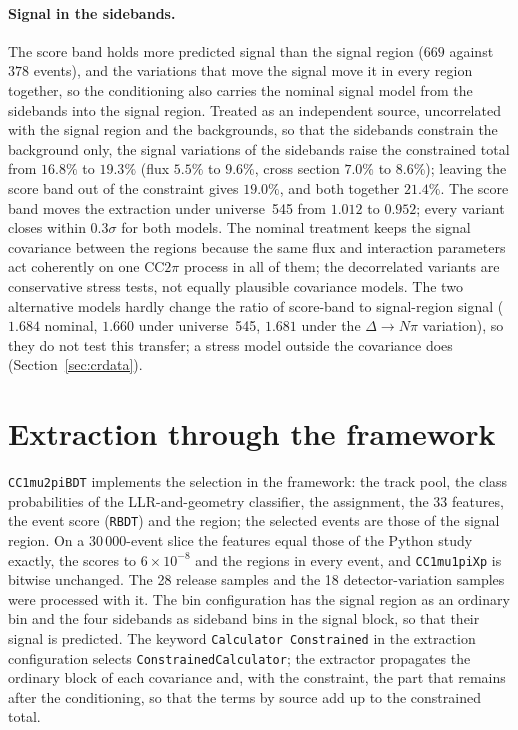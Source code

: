 \documentclass[11pt,a4paper]{article}
\begin{document}
\paragraph{Signal in the sidebands.} The score band holds more predicted signal than the signal region
($669$ against $378$ events), and the variations that move the signal move it in every region together, so
the conditioning also carries the nominal signal model from the sidebands into the signal region. Treated
as an independent source, uncorrelated with the signal region and the backgrounds, so that the sidebands
constrain the background only, the signal variations of the sidebands raise the constrained total from
$16.8\%$ to $19.3\%$ (flux $5.5\%$ to $9.6\%$, cross section $7.0\%$ to $8.6\%$); leaving the score band out
of the constraint gives $19.0\%$, and both together $21.4\%$. The score band moves the extraction under
universe~545 from $1.012$ to $0.952$; every variant closes within $0.3\sigma$ for both models. The nominal
treatment keeps the signal covariance between the regions because the same flux and interaction parameters act
coherently on one CC$2\pi$ process in all of them; the decorrelated variants are conservative stress tests, not
equally plausible covariance models. The two alternative models hardly change the ratio of score-band to
signal-region signal ($1.684$ nominal, $1.660$ under universe~545, $1.681$ under the $\Delta\to N\pi$
variation), so they do not test this transfer; a stress model outside the covariance does
(Section~\ref{sec:crdata}).

\section{Extraction through the framework}
\label{sec:framework}

\texttt{CC1mu2piBDT} implements the selection in the framework: the track pool, the class
probabilities of the LLR-and-geometry classifier, the assignment, the 33 features, the event score
(\texttt{RBDT}) and the region; the selected events are those of the signal region. On a
30\,000-event slice the features equal those of the Python study exactly, the scores to $6\times10^{-8}$
and the regions in every event, and \texttt{CC1mu1piXp} is bitwise unchanged. The 28 release samples
and the 18 detector-variation samples were processed with it. The bin configuration has the signal
region as an ordinary bin and the four sidebands as sideband bins in the signal block, so that their
signal is predicted. The keyword \texttt{Calculator Constrained} in the extraction configuration selects
\texttt{ConstrainedCalculator}; the extractor propagates the ordinary block of each covariance and,
with the constraint, the part that remains after the conditioning, so that the terms by source add up
to the constrained total.
\end{document}
